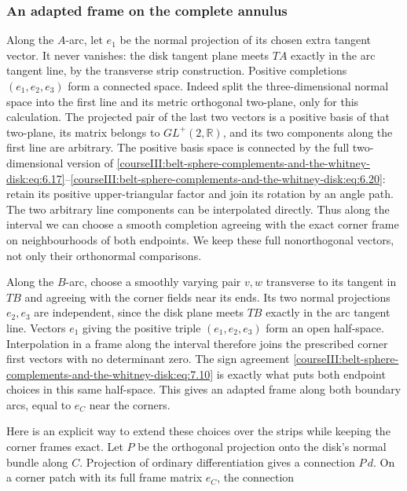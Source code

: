 \subsubsection{An adapted frame on the complete annulus}
\label{courseIII:belt-sphere-complements-and-the-whitney-disk:whitney-adapted-frame}

\label{courseIII:belt-sphere-complements-and-the-whitney-disk:section-7.5}

Along the \(A\)-arc, let \(e_1\) be the normal projection of its chosen extra tangent vector. It never vanishes: the disk tangent plane meets \(TA\) exactly in the arc tangent line, by the transverse strip construction. Positive completions \((e_1,e_2,e_3)\) form a connected space. Indeed split the three-dimensional normal space into the first line and its metric orthogonal two-plane, only for this calculation. The projected pair of the last two vectors is a positive basis of that two-plane, its matrix belongs to \(GL^+(2,\mathbb R)\), and its two components along the first line are arbitrary. The positive basis space is connected by the full two-dimensional version of \eqref{courseIII:belt-sphere-complements-and-the-whitney-disk:eq:6.17}--\eqref{courseIII:belt-sphere-complements-and-the-whitney-disk:eq:6.20}: retain its positive upper-triangular factor and join its rotation by an angle path. The two arbitrary line components can be interpolated directly. Thus along the interval we can choose a smooth completion agreeing with the exact corner frame on neighbourhoods of both endpoints. We keep these full nonorthogonal vectors, not only their orthonormal comparisons.

Along the \(B\)-arc, choose a smoothly varying pair \(v,w\) transverse to its tangent in \(TB\) and agreeing with the corner fields near its ends. Its two normal projections \(e_2,e_3\) are independent, since the disk plane meets \(TB\) exactly in the arc tangent line. Vectors \(e_1\) giving the positive triple \((e_1,e_2,e_3)\) form an open half-space. Interpolation in a frame along the interval therefore joins the prescribed corner first vectors with no determinant zero. The sign agreement \eqref{courseIII:belt-sphere-complements-and-the-whitney-disk:eq:7.10} is exactly what puts both endpoint choices in this same half-space. This gives an adapted frame along both boundary arcs, equal to \(e_C\) near the corners.

Here is an explicit way to extend these choices over the strips while keeping the corner frames exact. Let \(P\) be the orthogonal projection onto the disk's normal bundle along \(C\). Projection of ordinary differentiation gives a connection \(P\,d\). On a corner patch with its full frame matrix \(e_C\), the connection

